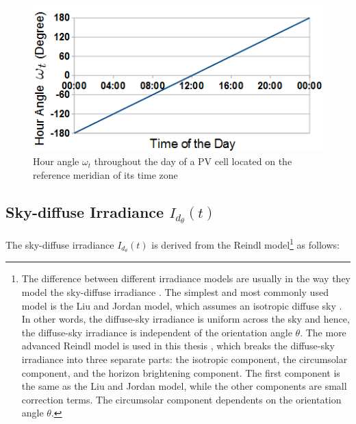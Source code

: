 \begin{figure}[H]
	\centering
		\includegraphics[width=0.6\columnwidth]{pictures/hour_angle_graph}
\caption{Hour angle $\omega_t$ throughout the day of a PV cell located on the reference meridian of its time zone \label{hour_angle_graph}}
\end{figure}


\subsection{Sky-diffuse Irradiance \texorpdfstring{$I_{d_\theta}(t)$}{I\_{d\_\{theta\}}(t)}}\label{sky_diffuse_component}
The sky-diffuse irradiance $I_{d_\theta}(t)$ is derived from the Reindl model\footnote{The difference between different irradiance models are usually in the way they model the sky-diffuse irradiance \cite{different_irradiance_model,DemainColienne2013Eodm,BertrandCdric2015Eodm}. The simplest and most commonly used model is the Liu and Jordan model, which assumes an isotropic diffuse sky \cite{irradianceModels}. In other words, the diffuse-sky irradiance is uniform across the sky and hence, the diffuse-sky irradiance is independent of the orientation angle $\theta$. The more advanced Reindl model is used in this thesis \cite{GueymardChristianA.2009Daiu}, which breaks the diffuse-sky irradiance into three separate parts: the isotropic component, the circumsolar component, and the horizon brightening component. The first component is the same as the Liu and Jordan model, while the other components are small correction terms. The circumsolar component dependents on the orientation angle $\theta$.} \cite{reindl,diffuse} as follows:

\footnotesize


